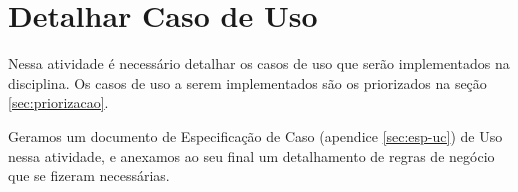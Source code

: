 \chapter{Detalhar Caso de Uso}

Nessa atividade é necessário detalhar os casos de uso que serão implementados na disciplina. Os casos de uso a serem implementados são os priorizados na seção \ref{sec:priorizacao}.

Geramos um documento de Especificação de Caso (apendice \ref{sec:esp-uc}) de Uso nessa atividade, e anexamos ao seu final um detalhamento de regras de negócio que se fizeram necessárias.
